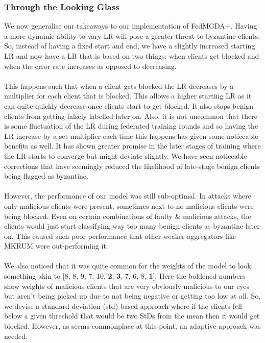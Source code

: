 \subsubsection{Through the Looking Glass}
We now generalise our takeaways to our implementation of FedMGDA+. 
Having a more dynamic ability to vary LR will pose a greater threat to byzantine clients.
So, instead of having a fixed start and end, we have a slightly increased starting LR and now have a LR that is based on two things: when clients get blocked and when the error rate increases as opposed to decreasing.
\\ \\
This happens such that when a client gets blocked the LR decreases by a multiplier for each client that is blocked.
This allows a higher starting LR as it can quite quickly decrease once clients start to get blocked.
It also stops benign clients from getting falsely labelled later on.
Also, it is not uncommon that there is some fluctuation of the LR during federated training rounds and so having the LR increase by a set multiplier each time this happens has given some noticeable benefits as well.
It has shown greater promise in the later stages of training where the LR starts to converge but might deviate slightly.
We have seen noticeable corrections that have seemingly reduced the likelihood of late-stage benign clients being flagged as byzantine.
\\ \\
However, the performance of our model was still sub-optimal.
In attacks where only malicious clients were present, sometimes next to no malicious clients were being blocked.
Even on certain combinations of faulty \& malicious attacks, the clients would just start classifying way too many benign clients as byzantine later on.
This caused such poor performance that other weaker aggregators like MKRUM were out-performing it.
\\ \\
We also noticed that it was quite common for the weights of the model to look something akin to [8, 8, 9, 7, 10, \textbf{2}, \textbf{3}, 7, 6, 8, \textbf{1}].
Here the boldened numbers show weights of malicious clients that are very obviously malicious to our eyes but aren't being picked up due to not being negative or getting too low at all.
So, we devise a standard deviation (std)-based approach where if the clients fell below a given threshold that would be two StDs from the mean then it would get blocked.
However, as seems commonplace at this point, an adaptive approach was needed.

